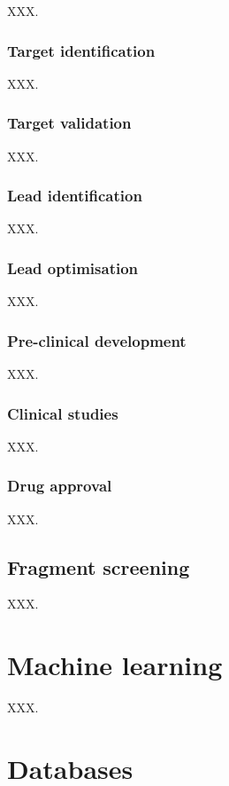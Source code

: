 XXX.

\subsubsection{Target identification}

XXX.

\subsubsection{Target validation}

XXX.

\subsubsection{Lead identification}

XXX.

\subsubsection{Lead optimisation}

XXX.

\subsubsection{Pre-clinical development}

XXX.

\subsubsection{Clinical studies}

XXX.

\subsubsection{Drug approval}

XXX.

\subsection{Fragment screening}

XXX.

\section{Machine learning}

XXX.

\section{Databases}


